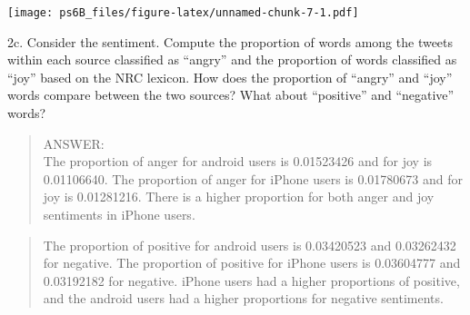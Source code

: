 \documentclass[
]{article}
\newenvironment{Shaded}{\begin{snugshade}}{\end{snugshade}}
\newcommand{\AttributeTok}[1]{\textcolor[rgb]{0.77,0.63,0.00}{#1}}
\newcommand{\CommentTok}[1]{\textcolor[rgb]{0.56,0.35,0.01}{\textit{#1}}}
\newcommand{\FunctionTok}[1]{\textcolor[rgb]{0.00,0.00,0.00}{#1}}
\newcommand{\NormalTok}[1]{#1}
\newcommand{\OtherTok}[1]{\textcolor[rgb]{0.56,0.35,0.01}{#1}}
\newcommand{\SpecialCharTok}[1]{\textcolor[rgb]{0.00,0.00,0.00}{#1}}
\newcommand{\StringTok}[1]{\textcolor[rgb]{0.31,0.60,0.02}{#1}}
\begin{document}
\texttt{[image: ps6B\_files/figure-latex/unnamed-chunk-7-1.pdf]}

\newpage

2c. Consider the sentiment. Compute the proportion of words among the
tweets within each source classified as ``angry'' and the proportion of
words classified as ``joy'' based on the NRC lexicon. How does the
proportion of ``angry'' and ``joy'' words compare between the two
sources? What about ``positive'' and ``negative'' words?

\begin{quote}
ANSWER:\\
The proportion of anger for android users is 0.01523426 and for joy is
0.01106640. The proportion of anger for iPhone users is 0.01780673 and
for joy is 0.01281216. There is a higher proportion for both anger and
joy sentiments in iPhone users.
\end{quote}

\begin{quote}
The proportion of positive for android users is 0.03420523 and
0.03262432 for negative. The proportion of positive for iPhone users is
0.03604777 and 0.03192182 for negative. iPhone users had a higher
proportions of positive, and the android users had a higher proportions
for negative sentiments.
\end{quote}

\begin{Shaded}
\end{Shaded}
\end{document}
